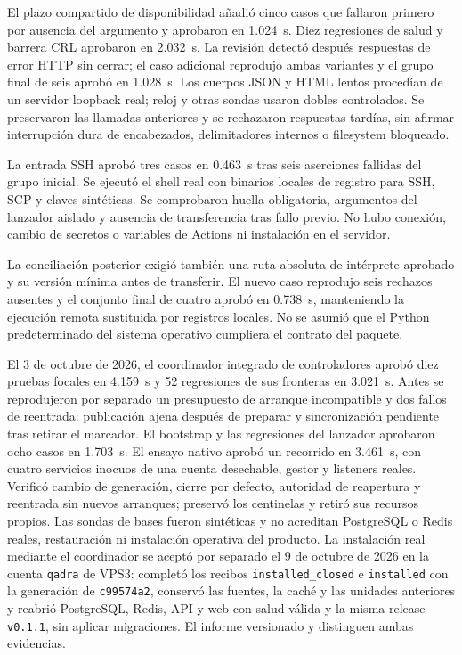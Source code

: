 El plazo compartido de disponibilidad añadió cinco casos que fallaron primero
por ausencia del argumento y aprobaron en 1.024~s. Diez regresiones de salud y
barrera CRL aprobaron en 2.032~s. La revisión detectó después respuestas de error
HTTP sin cerrar; el caso adicional reprodujo ambas variantes y el grupo final
de seis aprobó en 1.028~s. Los cuerpos JSON y HTML lentos procedían de un servidor
loopback real; reloj y otras sondas usaron dobles controlados. Se preservaron las
llamadas anteriores y se rechazaron respuestas tardías, sin afirmar interrupción
dura de encabezados, delimitadores internos o filesystem bloqueado.

La entrada SSH aprobó tres casos en 0.463~s tras seis aserciones fallidas del
grupo inicial. Se ejecutó el shell real con binarios locales de registro para
SSH, SCP y claves sintéticas. Se comprobaron huella obligatoria, argumentos del
lanzador aislado y ausencia de transferencia tras fallo previo. No hubo conexión,
cambio de secretos o variables de Actions ni instalación en el servidor.

La conciliación posterior exigió también una ruta absoluta de intérprete
aprobado y su versión mínima antes de transferir. El nuevo caso reprodujo seis
rechazos ausentes y el conjunto final de cuatro aprobó en 0.738~s, manteniendo
la ejecución remota sustituida por registros locales. No se asumió que el
Python predeterminado del sistema operativo cumpliera el contrato del paquete.


El 3 de octubre de 2026, el coordinador integrado de controladores aprobó diez
pruebas focales en 4.159~s y 52 regresiones de sus fronteras en 3.021~s. Antes se reprodujeron
por separado un presupuesto de arranque incompatible y dos fallos de reentrada:
publicación ajena después de preparar y sincronización pendiente tras retirar
el marcador. El bootstrap y las regresiones del lanzador aprobaron ocho casos
en 1.703~s. El ensayo nativo aprobó un recorrido en 3.461~s, con cuatro servicios
inocuos de una cuenta desechable, gestor y listeners reales. Verificó cambio de
generación, cierre por defecto, autoridad de reapertura y reentrada sin nuevos
arranques; preservó los centinelas y retiró sus recursos propios. Las sondas de
bases fueron sintéticas y no acreditan PostgreSQL o Redis reales, restauración
ni instalación operativa del producto. La instalación real mediante el
coordinador se aceptó por separado el 9 de octubre de 2026 en la cuenta
\texttt{qadra} de VPS3: completó los
recibos \texttt{installed\_closed} e \texttt{installed} con la generación de
\texttt{c99574a2}, conservó las fuentes, la caché y las unidades anteriores y
reabrió PostgreSQL, Redis, API y web con salud válida y la misma release
\texttt{v0.1.1}, sin aplicar migraciones. El informe versionado y
 distinguen ambas
evidencias.

